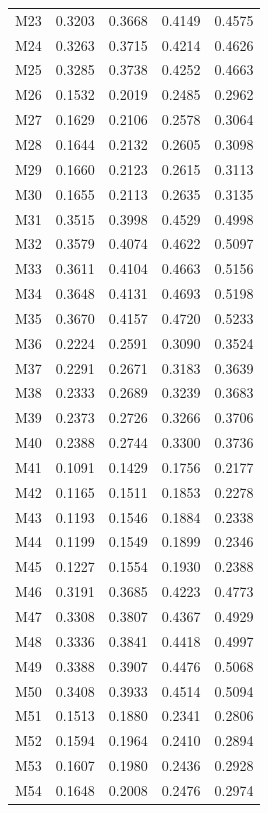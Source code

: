 \begin{longtable}{lrrrr}
M23 & 0.3203 & 0.3668 & 0.4149 & 0.4575 \\
M24 & 0.3263 & 0.3715 & 0.4214 & 0.4626 \\
M25 & 0.3285 & 0.3738 & 0.4252 & 0.4663 \\
M26 & 0.1532 & 0.2019 & 0.2485 & 0.2962 \\
M27 & 0.1629 & 0.2106 & 0.2578 & 0.3064 \\
M28 & 0.1644 & 0.2132 & 0.2605 & 0.3098 \\
M29 & 0.1660 & 0.2123 & 0.2615 & 0.3113 \\
M30 & 0.1655 & 0.2113 & 0.2635 & 0.3135 \\
M31 & 0.3515 & 0.3998 & 0.4529 & 0.4998 \\
M32 & 0.3579 & 0.4074 & 0.4622 & 0.5097 \\
M33 & 0.3611 & 0.4104 & 0.4663 & 0.5156 \\
M34 & 0.3648 & 0.4131 & 0.4693 & 0.5198 \\
M35 & 0.3670 & 0.4157 & 0.4720 & 0.5233 \\
M36 & 0.2224 & 0.2591 & 0.3090 & 0.3524 \\
M37 & 0.2291 & 0.2671 & 0.3183 & 0.3639 \\
M38 & 0.2333 & 0.2689 & 0.3239 & 0.3683 \\
M39 & 0.2373 & 0.2726 & 0.3266 & 0.3706 \\
M40 & 0.2388 & 0.2744 & 0.3300 & 0.3736 \\
M41 & 0.1091 & 0.1429 & 0.1756 & 0.2177 \\
M42 & 0.1165 & 0.1511 & 0.1853 & 0.2278 \\
M43 & 0.1193 & 0.1546 & 0.1884 & 0.2338 \\
M44 & 0.1199 & 0.1549 & 0.1899 & 0.2346 \\
M45 & 0.1227 & 0.1554 & 0.1930 & 0.2388 \\
M46 & 0.3191 & 0.3685 & 0.4223 & 0.4773 \\
M47 & 0.3308 & 0.3807 & 0.4367 & 0.4929 \\
M48 & 0.3336 & 0.3841 & 0.4418 & 0.4997 \\
M49 & 0.3388 & 0.3907 & 0.4476 & 0.5068 \\
M50 & 0.3408 & 0.3933 & 0.4514 & 0.5094 \\
M51 & 0.1513 & 0.1880 & 0.2341 & 0.2806 \\
M52 & 0.1594 & 0.1964 & 0.2410 & 0.2894 \\
M53 & 0.1607 & 0.1980 & 0.2436 & 0.2928 \\
M54 & 0.1648 & 0.2008 & 0.2476 & 0.2974 \\

\end{longtable}
